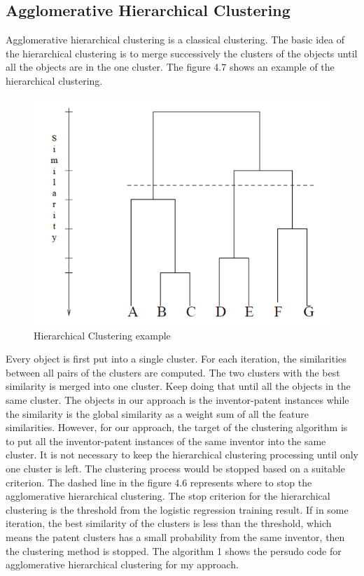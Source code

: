 \subsection{Agglomerative Hierarchical Clustering}
Agglomerative hierarchical clustering is a classical clustering. The basic idea of the hierarchical clustering is to merge successively the clusters of the objects until all the objects are in the one cluster. The figure 4.7 shows an example of the hierarchical clustering. 
\begin{figure}
\centering
\includegraphics[scale=0.5]{Hierachical.png}
\caption{Hierarchical Clustering example}
\end{figure}
Every object is first put into a single cluster. For each iteration, the similarities between all pairs of the clusters are computed. The two clusters with the best similarity is merged into one cluster. Keep doing that until all the objects in the same cluster. The objects in our approach is the inventor-patent instances while the similarity is the global similarity as a weight sum of all the feature similarities. However, for our approach, the target of the clustering algorithm is to put all the inventor-patent instances of the same inventor into the same cluster. It is not necessary to keep the hierarchical clustering processing until only one cluster is left. The clustering process would be stopped based on a suitable criterion. The dashed line in the figure 4.6 represents where to stop the agglomerative hierarchical clustering. The stop criterion for the hierarchical clustering is the threshold from the logistic regression training result. If in some iteration, the best similarity of the clusters is less than the threshold, which means the patent clusters has a small probability from the same inventor, then the clustering method is stopped.  The algorithm 1 shows the persudo code for agglomerative hierarchical clustering for my approach.


